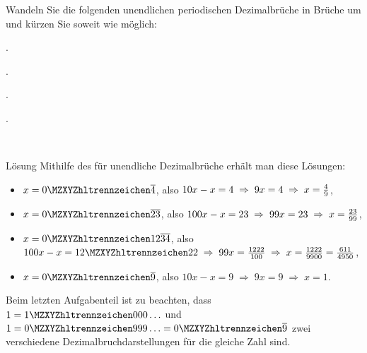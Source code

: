 \begin{MExercises}
\begin{MExercise}
Wandeln Sie die folgenden unendlichen periodischen Dezimalbrüche in Brüche um und kürzen Sie soweit wie möglich:
\begin{MExerciseItems}
\item{.}
\item{.}
\item{.}
\item{.}
\end{MExerciseItems}
\end{MExercise}
\ \\
\begin{MHint}{Lösung}
Mithilfe des  für unendliche Dezimalbrüche erhält man diese Lösungen:
\begin{itemize}
\item{$x=\MZahl{0}{}\overline{4}$, also $\displaystyle 10x-x=4\;\Rightarrow\;9x=4\;\Rightarrow\;x=\tfrac{4}{9}$,}
\item{$x=\MZahl{0}{}\overline{23}$, also $\displaystyle 100x-x=23\;\Rightarrow\;99x=23\;\Rightarrow\; x=\tfrac{23}{99}$,}
\item{$x=\MZahl{0}{12}\overline{34}$, also $\displaystyle 100x-x=\MZahl{12}{22}\;\Rightarrow\;99x=\Mtfrac{1222}{100}\;\Rightarrow\;x=\Mtfrac{1222}{9900}=\Mtfrac{611}{4950}$,}
\item{$x=\MZahl{0}{}\overline{9}$, also $\displaystyle 10x-x=9\;\Rightarrow\;9x=9\;\Rightarrow\;x=1$.}
 \end{itemize}
 Beim letzten Aufgabenteil ist zu beachten, dass $1=\MZahl{1}{000}\ldots$ und $1=\MZahl{0}{999}\ldots=\MZahl{0}{}\overline{9}$
 zwei verschiedene Dezimalbruchdarstellungen für die gleiche Zahl sind.
\end{MHint}
\end{MExercises}



